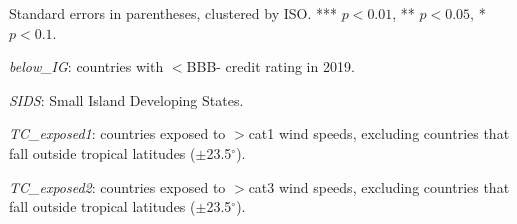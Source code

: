 \documentclass[10pt]{article}
\begin{document}
\begin{table}[h!]
\begin{threeparttable}
\begin{tabular}{lcccccc}
  \end{tabular}
  \begin{tablenotes}
    \footnotesize
    \item Standard errors in parentheses, clustered by ISO. *** $p<0.01$, ** $p<0.05$, * $p<0.1$.
    \item \textit{below\_IG}: countries with $<$BBB- credit rating in 2019.
    \item \textit{SIDS}: Small Island Developing States.
    \item \textit{TC\_exposed1}: countries exposed to $>$cat1 wind speeds, excluding countries that fall outside tropical latitudes ($\pm$23.5$^\circ$).
    \item \textit{TC\_exposed2}: countries exposed to $>$cat3 wind speeds, excluding countries that fall outside tropical latitudes ($\pm$23.5$^\circ$).
  \end{tablenotes}
  \end{threeparttable}
\end{table}
\end{document}
